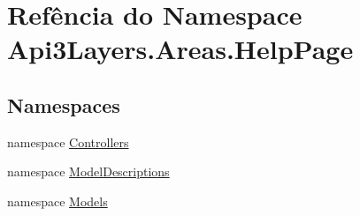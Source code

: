 \hypertarget{namespaceApi3Layers_1_1Areas_1_1HelpPage}{}\section{Refência do Namespace Api3\+Layers.\+Areas.\+Help\+Page}
\label{namespaceApi3Layers_1_1Areas_1_1HelpPage}
\subsection*{Namespaces}
\begin{DoxyCompactItemize}
\item 
namespace \hyperlink{namespaceApi3Layers_1_1Areas_1_1HelpPage_1_1Controllers}{Controllers}
\item 
namespace \hyperlink{namespaceApi3Layers_1_1Areas_1_1HelpPage_1_1ModelDescriptions}{Model\+Descriptions}
\item 
namespace \hyperlink{namespaceApi3Layers_1_1Areas_1_1HelpPage_1_1Models}{Models}
\end{DoxyCompactItemize}
